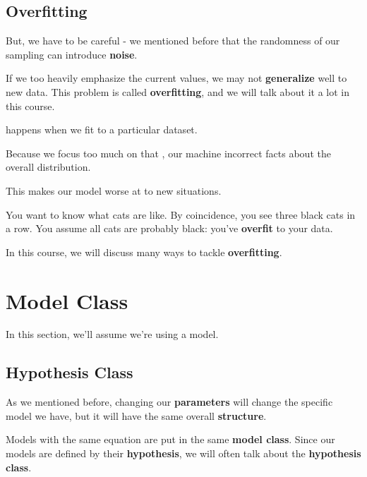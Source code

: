         \subsection{Overfitting}
        
        But, we have to be careful - we mentioned before that the randomness of our sampling can introduce \textbf{noise}.
        
        If we too heavily emphasize the current values, we may not \textbf{generalize} well to new data. This problem is called \textbf{overfitting}, and we will talk about it a lot in this course.\\
        
        \begin{definition}
             happens when we fit  to a particular dataset. 
            
            Because we focus too much on that , our machine  incorrect facts about the overall distribution. 
            
             This makes our model worse at  to new situations.
        \end{definition}
        
        \miniex You want to know what cats are like. By coincidence, you see three black cats in a row. You assume all cats are probably black: you've \textbf{overfit} to your data.
        
        In this course, we will discuss many ways to tackle \textbf{overfitting}.


\pagebreak

\section{Model Class}

    In this section, we'll assume we're using a model. 
    
    \subsection{Hypothesis Class}
    
        As we mentioned before, changing our \textbf{parameters} will change the specific model we have, but it will have the same overall \textbf{structure}.
        
        Models with the same equation are put in the same \textbf{model class}. Since our models are defined by their \textbf{hypothesis}, we will often talk about the \textbf{hypothesis class}.\\
        

